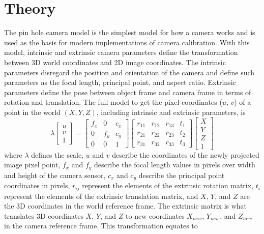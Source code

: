 \section{Theory}\label{sec:callibtheory}
The pin hole camera model is the simplest model for how a camera works and is used as the basis for modern implementations of camera calibration. With this model, intrinsic and extrinsic camera parameters define the transformation between 3D world coordinates and 2D image coordinates. The intrinsic parameters
disregard the position and orientation of the camera and define such parameters as the focal length, principal point, and aspect ratio. Extrinsic parameters define the pose between object frame and camera frame in terms of rotation and translation. The full model to get the pixel coordinates ($u$, $v$) of a point in the world $(X, Y, Z)$, including intrinsic and extrinsic parameters, is 
%
\begin{equation}
\lambda 
\left[\begin{array}{c} u \\ v \\ 1 \end{array} \right]
=
\begin{bmatrix}
f_x & 0 & c_x \\ 0 & f_y & c_y \\ 0 & 0 & 1
\end{bmatrix}
\begin{bmatrix}
r_{11} & r_{12} & r_{13} & t_1 \\ r_{21} & r_{22} & r_{23} & t_2 \\ r_{31} & r_{32} & r_{33} & t_3
\end{bmatrix}
\left[\begin{array}{c} X \\ Y \\ Z \\ 1 \end{array} \right]
\end{equation}
%
where $\lambda$ defines the scale, $u$ and $v$ describe the coordinates of the newly projected image pixel point, $f_{x}$ and $f_{y}$ describe the focal length values in pixels over width and height of the camera sensor, $c_{x}$ and $c_{y}$ describe the principal point coordinates in pixels, $r_{ij}$ represent the elements of the extrinsic rotation matrix, $t_i$ represent the elements of the extrinsic translation matrix, and $X$, $Y$, and $Z$ are the 3D coordinates in the world reference frame. The extrinsic matrix is what translates 3D coordinates $X$, $Y$, and $Z$ to new coordinates $X_{new}$, $Y_{new}$, and $Z_{new}$ in the camera reference frame. This transformation equates to
